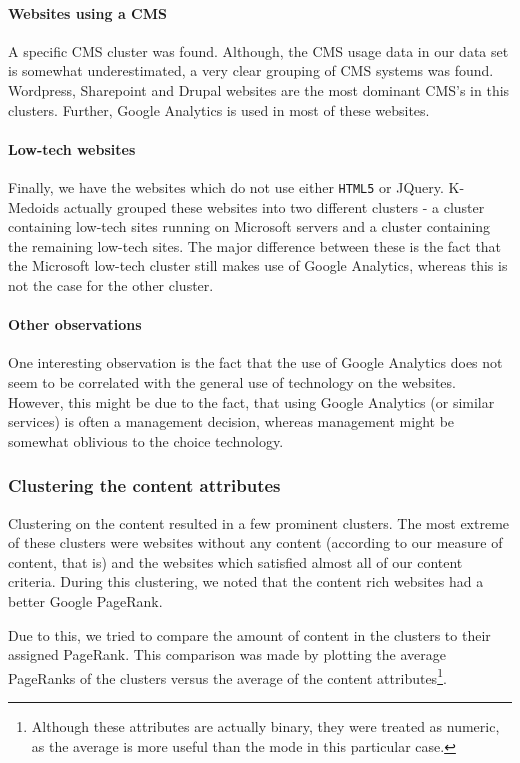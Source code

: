 \paragraph{Websites using a CMS}

A specific CMS cluster was found. Although, the CMS usage data in our data set is somewhat underestimated, a very clear grouping of CMS systems was found. Wordpress, Sharepoint and Drupal websites are the most dominant CMS's in this clusters. Further, Google Analytics is used in most of these websites.

\paragraph{Low-tech websites}

Finally, we have the websites which do not use either \texttt{HTML5} or JQuery. K-Medoids actually grouped these websites into two different clusters - a cluster containing low-tech sites running on Microsoft servers and a cluster containing the remaining low-tech sites. The major difference between these is the fact that the Microsoft low-tech cluster still makes use of Google Analytics, whereas this is not the case for the other cluster.

\paragraph{Other observations} 

One interesting observation is the fact that the use of Google Analytics does not seem to be correlated with the general use of technology on the websites. However, this might be due to the fact, that using Google Analytics (or similar services) is often a management decision, whereas management might be somewhat oblivious to the choice technology.

\subsubsection{Clustering the content attributes}

Clustering on the content resulted in a few prominent clusters. The most extreme of these clusters were websites without any content (according to our measure of content, that is) and the websites which satisfied almost all of our content criteria. During this clustering, we noted that the content rich websites had a better Google PageRank.

Due to this, we tried to compare the amount of content in the clusters to their assigned PageRank. This comparison was made by plotting the average PageRanks of the clusters versus the average of the content attributes\footnote{Although these attributes are actually binary, they were treated as numeric, as the average is more useful than the mode in this particular case.}.

